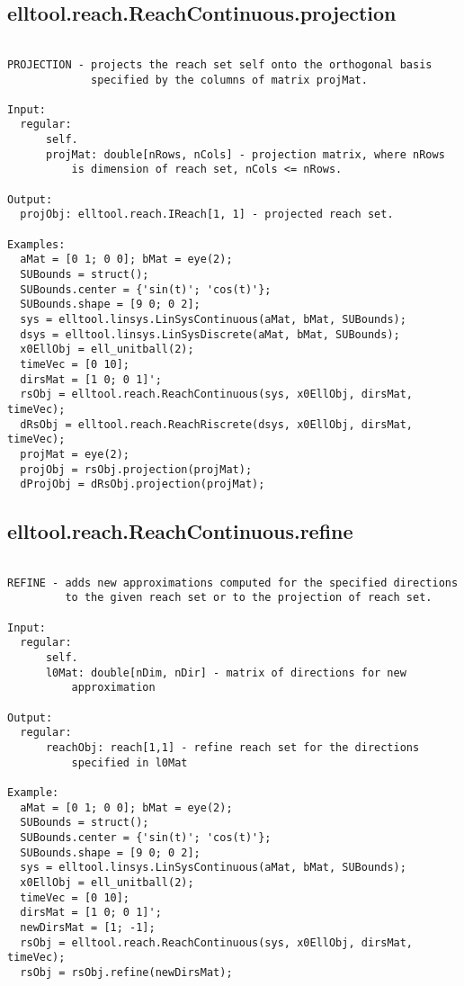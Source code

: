\subsection{\texorpdfstring{elltool.reach.ReachContinuous.projection}{projection}}\label{method:elltool.reach.ReachContinuous.projection}
\begin{verbatim}

PROJECTION - projects the reach set self onto the orthogonal basis
             specified by the columns of matrix projMat.

Input:
  regular:
      self.
      projMat: double[nRows, nCols] - projection matrix, where nRows
          is dimension of reach set, nCols <= nRows.

Output:
  projObj: elltool.reach.IReach[1, 1] - projected reach set.

Examples:
  aMat = [0 1; 0 0]; bMat = eye(2);
  SUBounds = struct();
  SUBounds.center = {'sin(t)'; 'cos(t)'};
  SUBounds.shape = [9 0; 0 2];
  sys = elltool.linsys.LinSysContinuous(aMat, bMat, SUBounds);
  dsys = elltool.linsys.LinSysDiscrete(aMat, bMat, SUBounds);
  x0EllObj = ell_unitball(2);
  timeVec = [0 10];
  dirsMat = [1 0; 0 1]';
  rsObj = elltool.reach.ReachContinuous(sys, x0EllObj, dirsMat, timeVec);
  dRsObj = elltool.reach.ReachRiscrete(dsys, x0EllObj, dirsMat, timeVec);
  projMat = eye(2);
  projObj = rsObj.projection(projMat);
  dProjObj = dRsObj.projection(projMat);
\end{verbatim}
\subsection{\texorpdfstring{elltool.reach.ReachContinuous.refine}{refine}}\label{method:elltool.reach.ReachContinuous.refine}
\begin{verbatim}

REFINE - adds new approximations computed for the specified directions
         to the given reach set or to the projection of reach set.

Input:
  regular:
      self.
      l0Mat: double[nDim, nDir] - matrix of directions for new
          approximation

Output:
  regular:
      reachObj: reach[1,1] - refine reach set for the directions
          specified in l0Mat

Example:
  aMat = [0 1; 0 0]; bMat = eye(2);
  SUBounds = struct();
  SUBounds.center = {'sin(t)'; 'cos(t)'};
  SUBounds.shape = [9 0; 0 2];
  sys = elltool.linsys.LinSysContinuous(aMat, bMat, SUBounds);
  x0EllObj = ell_unitball(2);
  timeVec = [0 10];
  dirsMat = [1 0; 0 1]';
  newDirsMat = [1; -1];
  rsObj = elltool.reach.ReachContinuous(sys, x0EllObj, dirsMat, timeVec);
  rsObj = rsObj.refine(newDirsMat);
\end{verbatim}
